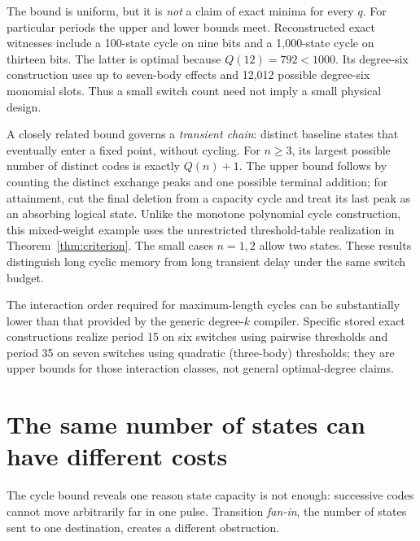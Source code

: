 \documentclass[12pt,letterpaper]{article}
\theoremstyle{definition}\newtheorem{definition}[theorem]{Definition}
\theoremstyle{remark}\newtheorem{remark}[theorem]{Remark}
\begin{document}
The bound is uniform, but it is \emph{not} a claim of exact minima for every $q$. For particular periods the upper and lower bounds meet. Reconstructed exact witnesses include a 100-state cycle on nine bits and a 1,000-state cycle on thirteen bits. The latter is optimal because $Q(12)=792<1000$. Its degree-six construction uses up to seven-body effects and 12,012 possible degree-six monomial slots. Thus a small switch count need not imply a small physical design.

A closely related bound governs a \emph{transient chain}: distinct baseline states that eventually enter a fixed point, without cycling. For $n\ge3$, its largest possible number of distinct codes is exactly $Q(n)+1$. The upper bound follows by counting the distinct exchange peaks and one possible terminal addition; for attainment, cut the final deletion from a capacity cycle and treat its last peak as an absorbing logical state. Unlike the monotone polynomial cycle construction, this mixed-weight example uses the unrestricted threshold-table realization in Theorem~\ref{thm:criterion}. The small cases $n=1,2$ allow two states. These results distinguish long cyclic memory from long transient delay under the same switch budget.

The interaction order required for maximum-length cycles can be substantially lower than that provided by the generic degree-$k$ compiler. Specific stored exact constructions realize period 15 on six switches using pairwise thresholds and period 35 on seven switches using quadratic (three-body) thresholds; they are upper bounds for those interaction classes, not general optimal-degree claims.

\section{The same number of states can have different costs}\label{sec:tasks}
The cycle bound reveals one reason state capacity is not enough: successive codes cannot move arbitrarily far in one pulse. Transition \emph{fan-in}, the number of states sent to one destination, creates a different obstruction.
\end{document}
